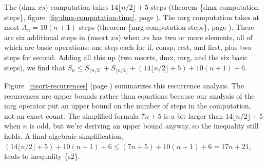 The \textsf{(dmx $xs$)} computation takes $14\lfloor  n/2\rfloor + 5$ steps
(theorem \{dmx computation steps\},
figure~\ref{fig:dmx-computation-time},
page \pageref{fig:dmx-computation-time}).
The \textsf{mrg} computation takes at most $A_n = 10(n+1)$ steps
(theorem \{mrg computation steps\}, page \pageref{thm:mrg-steps}).
There are six additional steps
in \textsf{(msort $xs$)} when $xs$ has two or more elements,
all of which are basic operations:
one step each for \textsf{if}, \textsf{consp}, \textsf{rest}, and \textsf{first},
plus two steps for \textsf{second}.
Adding all this up
(two \textsf{msorts}, \textsf{dmx}, \textsf{mrg}, and the six basic steps),
we find that
$S_n \leq S_{\lceil  n/2\rceil} + S_{\lfloor  n/2\rfloor} +
          (14\lfloor n/2\rfloor + 5) + 10(n+1) + 6$.

Figure~\ref{msort-recurrences} (page \pageref{msort-recurrences})
summarizes this recurrence analysis.
The recurrences are upper bounds rather than equations because
our analysis of the \textsf{mrg} operator put an upper bound on
the number of steps in the computation, not an exact count.
The simplified formula $7n + 5$
is a bit larger than $14\lfloor n/2\rfloor + 5$
when $n$ is odd, but we're deriving an upper bound
anyway, so the inequality still holds.
A final algebraic simplification,
$(14\lfloor n/2\rfloor + 5) + 10(n+1) + 6 \leq (7n + 5) + 10(n+1) + 6 = 17n + 21$,
leads to inequality \{s2\}.

